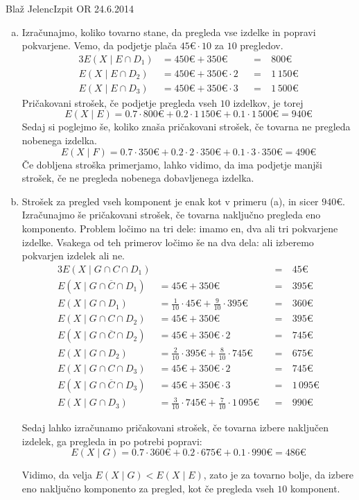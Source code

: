 \begin{naloga}{Blaž Jelenc}{Izpit OR 24.6.2014}
\begin{odgovor}
\begin{enumerate}[(a)]
\item Izračunajmo, koliko tovarno stane,
da pregleda vse izdelke in popravi po\-kva\-rje\-ne.
Vemo, da podjetje plača $45 € \cdot 10$ za $10$ pregledov.
\begin{alignat*}{3}
E(X \mid E \cap D_1) &= 450 € + 350 € &&=&\ 800 € \\
E(X \mid E \cap D_2) &= 450 € + 350 € \cdot 2 &&=&\ 1\,150 € \\
E(X \mid E \cap D_3) &= 450 € + 350 € \cdot 3 &&=&\ 1\,500 €
\end{alignat*}
Pričakovani strošek, če podjetje pregleda vseh $10$ izdelkov, je torej
$$
E(X \mid E) = 0.7 \cdot 800 € + 0.2 \cdot 1\,150 € + 0.1 \cdot 1\,500 € = 940 €
$$
Sedaj si poglejmo še, koliko znaša pričakovani strošek,
če tovarna ne pregleda nobenega izdelka.
$$
E(X \mid F) = 0.7 \cdot 350 € + 0.2 \cdot 2 \cdot 350 € + 0.1 \cdot 3 \cdot 350 € = 490 €
$$
Če dobljena stroška primerjamo, lahko vidimo,
da ima podjetje manjši strošek, če ne pregleda nobenega dobavljenega izdelka.

\item Strošek za pregled vseh komponent je enak kot v primeru (a),
in sicer $940 €$.
Izračunajmo še pričakovani strošek,
če tovarna naključno pregleda eno komponento.
Problem ločimo na tri dele:
imamo en, dva ali tri pokvarjene izdelke.
Vsakega od teh primerov ločimo še na dva dela:
ali izberemo pokvarjen izdelek ali ne.
\begin{alignat*}{3}
E(X \mid G \cap C \cap D_1) &&&=&\ 45 € \\
E(X \mid G \cap \overline{C} \cap D_1) &= 45 € + 350 € &&=&\ 395 € \\
E(X \mid G \cap D_1) &= \frac{1}{10} \cdot 45 € + \frac{9}{10} \cdot 395 €
&&=&\ 360 € \\[1ex]
E(X \mid G \cap C \cap D_2) &= 45 € + 350 € &&=&\ 395 € \\
E(X \mid G \cap \overline{C} \cap D_2) &= 45 € + 350 € \cdot 2 &&=&\ 745 € \\
E(X \mid G \cap D_2) &= \frac{2}{10} \cdot 395 € + \frac{8}{10} \cdot 745 €
&&=&\ 675 € \\[1ex]
E(X \mid G \cap C \cap D_3) &= 45 € + 350 € \cdot 2 &&=&\ 745 € \\
E(X \mid G \cap \overline{C} \cap D_3) &= 45 € + 350 € \cdot 3 &&=&\ 1\,095 € \\
E(X \mid G \cap D_3) &= \frac{3}{10} \cdot 745 € + \frac{7}{10} \cdot 1\,095 €
&&=&\ 990 €
\end{alignat*}

Sedaj lahko izračunamo pričakovani strošek,
če tovarna izbere naključen izdelek,
ga pregleda in po potrebi popravi:
$$
E(X \mid G) = 0.7 \cdot 360 € + 0.2 \cdot 675 € + 0.1 \cdot 990 € = 486 €
$$

Vidimo, da velja $E(X \mid G) < E(X \mid E)$,
zato je za tovarno bolje, da izbere eno naključno komponento za pregled,
kot če pregleda vseh $10$ komponent.
\end{enumerate}
\end{odgovor}
\end{naloga}
